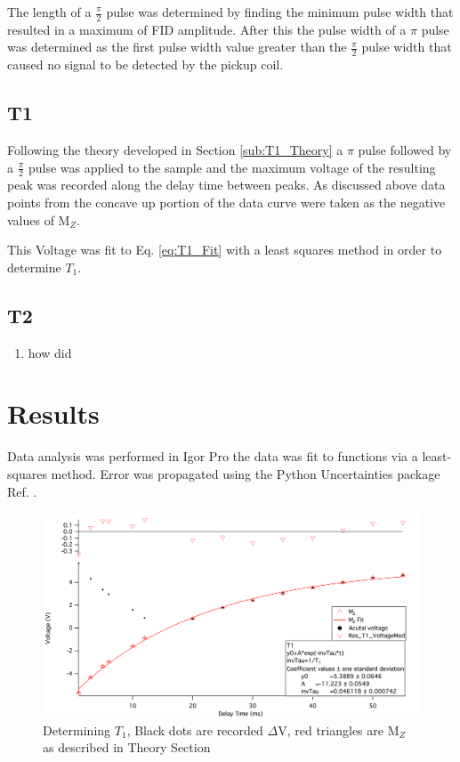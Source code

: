 \documentclass[11pt,letterpaper]{article}
\begin{document}
The length of a $\frac{\pi}{2}$ pulse was determined by finding the minimum pulse width that resulted in a maximum of FID amplitude. After this the pulse width of a $\pi$ pulse was determined as the first pulse width value greater than the $\frac{\pi}{2}$ pulse width that caused no signal to be detected by the pickup coil.

\subsection{T1}
Following the theory developed in Section \ref{sub:T1_Theory} a $\pi$ pulse followed by a $\frac{\pi}{2}$ pulse was applied to the sample and the maximum voltage of the resulting peak was recorded along the delay time between peaks. As discussed above data points from the concave up portion of the data curve were taken as the negative values of M$_Z$.

This Voltage was fit to Eq. \ref{eq:T1_Fit} with a least squares method in order to determine $T_1$.
\subsection{T2}
\begin{enumerate}
\item how did
\end{enumerate}
\section{Results}
Data analysis was performed in Igor Pro the data was fit to functions via a least-squares method. Error was propagated using the Python Uncertainties package Ref. \cite{Uncertainties}.

\begin{figure}[h!]
  \centering
      \includegraphics[scale=.3]{T1_Fit.png}
      \caption{{\small Determining $T_1$, Black dots are recorded $\Delta$V, red triangles are M$_Z$ as described in Theory Section}}
      \label{fig:T1_fit}
\end{figure}	
\end{document}
